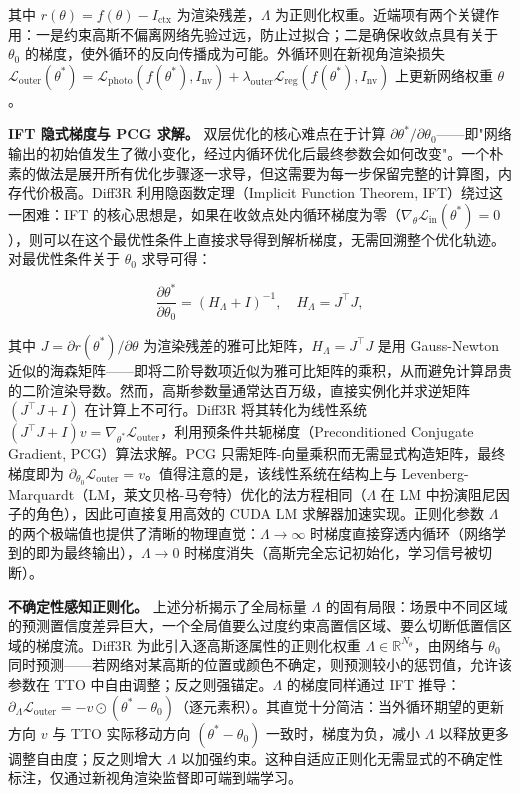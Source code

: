 其中 $r(\theta) = f(\theta) - I_{\text{ctx}}$ 为渲染残差，$\Lambda$ 为正则化权重。近端项有两个关键作用：一是约束高斯不偏离网络先验过远，防止过拟合；二是确保收敛点具有关于 $\theta_0$ 的梯度，使外循环的反向传播成为可能。外循环则在新视角渲染损失 $\mathcal{L}_{\text{outer}}(\theta^*) = \mathcal{L}_{\text{photo}}(f(\theta^*), I_{\text{nv}}) + \lambda_\text{outer} \mathcal{L}_{\text{reg}}(f(\theta^*), I_{\text{nv}})$ 上更新网络权重 $\theta$。

\textbf{IFT 隐式梯度与 PCG 求解。}
双层优化的核心难点在于计算 $\partial \theta^* / \partial \theta_0$——即"网络输出的初始值发生了微小变化，经过内循环优化后最终参数会如何改变"。一个朴素的做法是展开所有优化步骤逐一求导，但这需要为每一步保留完整的计算图，内存代价极高。Diff3R 利用隐函数定理（Implicit Function Theorem, IFT）绕过这一困难：IFT 的核心思想是，如果在收敛点处内循环梯度为零（$\nabla_\theta \mathcal{L}_{\text{in}}(\theta^*) = 0$），则可以在这个最优性条件上直接求导得到解析梯度，无需回溯整个优化轨迹。对最优性条件关于 $\theta_0$ 求导可得：

\begin{equation}
\frac{\partial \theta^*}{\partial \theta_0} = (H_\Lambda + I)^{-1}, \quad H_\Lambda = J^\top J,
\end{equation}

其中 $J = \partial r(\theta^*) / \partial \theta$ 为渲染残差的雅可比矩阵，$H_\Lambda = J^\top J$ 是用 Gauss-Newton 近似的海森矩阵——即将二阶导数项近似为雅可比矩阵的乘积，从而避免计算昂贵的二阶渲染导数。然而，高斯参数量通常达百万级，直接实例化并求逆矩阵 $(J^\top J + I)$ 在计算上不可行。Diff3R 将其转化为线性系统 $(J^\top J + I)v = \nabla_{\theta^*} \mathcal{L}_{\text{outer}}$，利用预条件共轭梯度（Preconditioned Conjugate Gradient, PCG）算法求解。PCG 只需矩阵-向量乘积而无需显式构造矩阵，最终梯度即为 $\partial_{\theta_0} \mathcal{L}_{\text{outer}} = v$。值得注意的是，该线性系统在结构上与 Levenberg-Marquardt（LM，莱文贝格-马夸特）优化的法方程相同（$\Lambda$ 在 LM 中扮演阻尼因子的角色），因此可直接复用高效的 CUDA LM 求解器加速实现。正则化参数 $\Lambda$ 的两个极端值也提供了清晰的物理直觉：$\Lambda \to \infty$ 时梯度直接穿透内循环（网络学到的即为最终输出），$\Lambda \to 0$ 时梯度消失（高斯完全忘记初始化，学习信号被切断）。

\textbf{不确定性感知正则化。}
上述分析揭示了全局标量 $\Lambda$ 的固有局限：场景中不同区域的预测置信度差异巨大，一个全局值要么过度约束高置信区域、要么切断低置信区域的梯度流。Diff3R 为此引入逐高斯逐属性的正则化权重 $\Lambda \in \mathbb{R}^{N_\theta}$，由网络与 $\theta_0$ 同时预测——若网络对某高斯的位置或颜色不确定，则预测较小的惩罚值，允许该参数在 TTO 中自由调整；反之则强锚定。$\Lambda$ 的梯度同样通过 IFT 推导：$\partial_\Lambda \mathcal{L}_{\text{outer}} = -v \odot (\theta^* - \theta_0)$（逐元素积）。其直觉十分简洁：当外循环期望的更新方向 $v$ 与 TTO 实际移动方向 $(\theta^* - \theta_0)$ 一致时，梯度为负，减小 $\Lambda$ 以释放更多调整自由度；反之则增大 $\Lambda$ 以加强约束。这种自适应正则化无需显式的不确定性标注，仅通过新视角渲染监督即可端到端学习。

